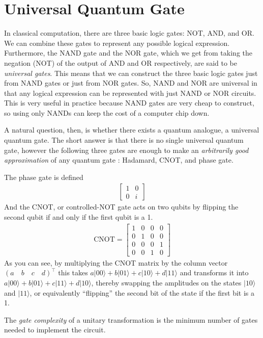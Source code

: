 \documentclass[12pt,twoside]{reedthesis}
\theoremstyle{definition}
\newcommand{\ket}[1]{\ensuremath{\lvert #1\rangle}\xspace}
\begin{document}
\section{Universal Quantum Gate}
In classical computation, there are three basic logic gates: NOT, AND, and OR. We can combine these gates to represent any possible logical expression. Furthermore, the NAND gate and the NOR gate, which we get from taking the negation (NOT) of the output of AND and OR respectively, are said to be \textit{universal gates}. This means that we can construct the three basic logic gates just from NAND gates or just from NOR gates. So, NAND and NOR are universal in that any logical expression can be represented with just NAND or NOR circuits. This is very useful in practice because NAND gates are very cheap to construct, so using only NANDs can keep the cost of a computer chip down.

A natural question, then, is whether there exists a quantum analogue, a universal quantum gate. The short answer is that there is no single universal quantum gate, however the following three gates are enough to make an \textit{arbitrarily good approximation} of any quantum gate \citep{nielsenchuang}: Hadamard, CNOT, and phase gate. 

The phase gate is defined
\begin{align}
\begin{bmatrix}
1 & 0\\
0 & i 
\end{bmatrix}
\end{align}
And the CNOT, or controlled-NOT gate acts on two qubits by flipping the second qubit if and only if the first qubit is a 1. 
\begin{align}
\text{CNOT} = \begin{bmatrix}
1 & 0 & 0 & 0 \\
0 & 1 & 0 & 0 \\
0 & 0 & 0 & 1 \\
0 & 0 & 1 & 0
\end{bmatrix}
\end{align}
As you can see, by multiplying the CNOT matrix by the column vector $(a\quad b\quad c\quad d)^\intercal$ this takes $a\ket{00} + b\ket{01} + c\ket{10} + d\ket{11}$ and transforms it into $a\ket{00} + b\ket{01} + c\ket{11} + d\ket{10}$, thereby swapping the amplitudes on the states $\ket{10}$ and $\ket{11}$, or equivalently ``flipping'' the second bit of the state if the first bit is a 1. 

The \textit{gate complexity} of a unitary transformation is the minimum number of gates needed to implement the circuit. 
\end{document}
